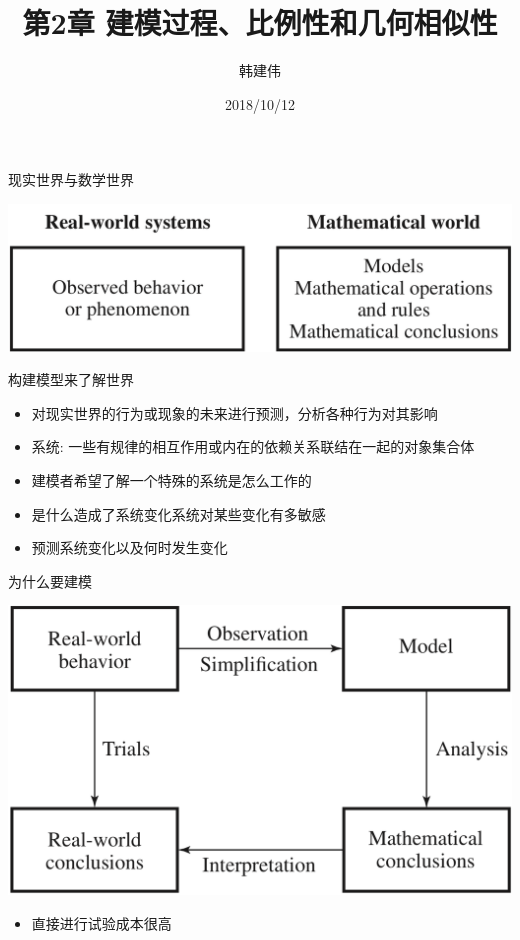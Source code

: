 \documentclass[UTF8]{ctexbeamer}
\title{第2章 建模过程、比例性和几何相似性}
\author{韩建伟}
\institute{
  计算机学院\\
  \texttt{hanjianwei@zjgsu.edu.cn}
}
\date{2018/10/12}
\begin{document}
\begin{frame}[plain]
  \titlepage{}
\end{frame}

\begin{frame}{现实世界与数学世界}

  \begin{center}
    \includegraphics[width=.5\textwidth{}]{real_and_math.png}
  \end{center}

  构建模型来了解世界

  \begin{itemize}
  \item 对现实世界的行为或现象的未来进行预测，分析各种行为对其影响
  \item 系统: 一些有规律的相互作用或内在的依赖关系联结在一起的对象集合体
  \item 建模者希望了解一个特殊的系统是怎么工作的
  \item 是什么造成了系统变化系统对某些变化有多敏感
  \item 预测系统变化以及何时发生变化
  \end{itemize}

\end{frame}

\begin{frame}{为什么要建模}
  \begin{center}
    \includegraphics[width=.5\textwidth{}]{whymm.png}
  \end{center}

  \begin{itemize}
  \item 直接进行试验成本很高
  \end{itemize}
\end{frame}
\end{document}
